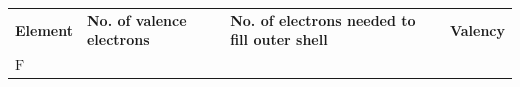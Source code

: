 \begin{enumerate}[noitemsep, label=\textbf{\arabic*}. ]
{    %
    
        \begin{center}
      
      \label{m38704*id139625}
      
    \noindent
      \tablelasttail{}
      \begin{xtabular*}{\mytablewidth}[t]{|p{10\mystarwidth}|p{10\mystarwidth}|p{10\mystarwidth}|p{10\mystarwidth}|}\hline
    
    
        \textbf{Element} &
    
    
        \textbf{No. of valence electrons} &
    
    
        \textbf{No. of electrons needed to fill outer shell} &
    
    
        \textbf{Valency}%
     \tabularnewline{}
    
    
        \begin{math}\mathrm{F}\end{math} &
    

\end{xtabular*}
\end{center}}
\end{enumerate}
